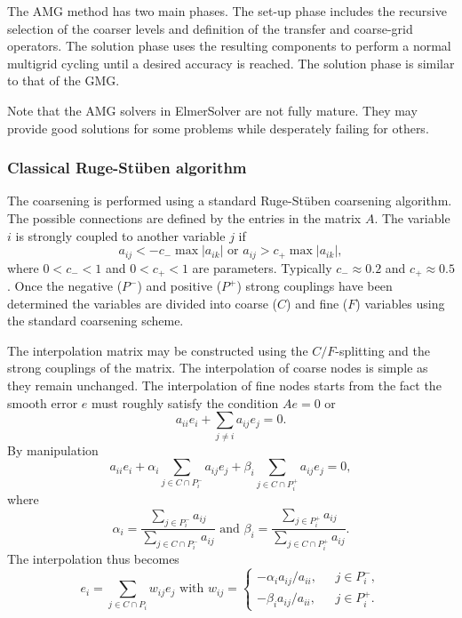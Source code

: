 \begin{versiona}
The AMG method has two main phases. The set-up phase includes the recursive selection of
the coarser levels and definition of the transfer and coarse-grid operators. 
The solution phase uses the resulting components to perform a normal multigrid
cycling until a desired accuracy is reached. The solution phase is similar
to that of the GMG.

Note that the AMG solvers in ElmerSolver are not fully mature. They may provide good solutions for 
some problems while desperately failing for others. 


\subsubsection*{Classical Ruge-St{\"u}ben algorithm}

The coarsening is performed using a standard Ruge-St{\"u}ben coarsening algorithm. 
The possible connections are defined by the 
entries in the matrix $A$. The variable $i$ is strongly coupled
to another variable $j$ if 
\begin{equation}
  a_{ij} < - c_{-} \max | a_{ik} |  \mbox{\ \ \ or \ \ \ }
  a_{ij} > c_{+} \max | a_{ik} | ,
\end{equation}
where $0<c_{-}<1$ and $0<c_{+}<1$ are parameters.
Typically $c_{-} \approx 0.2$ and $c_{+} \approx 0.5$.  
Once the negative ($P^{-}$) and positive ($P^{+}$) 
strong couplings have been determined 
the variables are divided into coarse ($C$) and fine ($F$) 
variables using the standard coarsening scheme.

The interpolation matrix may be constructed 
using the $C/F$-splitting and the strong couplings of the matrix.
The interpolation of coarse nodes is simple as they remain unchanged. 
The interpolation of fine nodes 
starts from the fact the smooth error $e$ 
must roughly satisfy the condition $Ae=0$ or
\begin{equation}
  a_{ii} e_i + \sum_{j \neq i} a_{ij} e_j = 0 .
  \label{eq_interpolate}
\end{equation}
By manipulation 
\begin{equation}
  a_{ii} e_i + \alpha_i \sum_{j \in C \cap P_i^{-}} a_{ij} e_j +
\beta_i \sum_{j \in C \cap P_i^{+}} a_{ij} e_j = 0,
\end{equation}
where
\begin{equation}
  \alpha_i = \frac{ \sum_{j \in P_i^{-}} a_{ij} }{ \sum_{j \in C \cap P_i^{-}} a_{ij}  }
 \mbox{\ \ \ and \ \ \ }
  \beta_i = \frac{ \sum_{j \in P_i^{+}} a_{ij} }{ \sum_{j \in C \cap P_i^{+}} a_{ij}  } .
\end{equation}
The interpolation thus becomes 
\begin{equation}
  e_i = \sum_{j \in C \cap P_i} w_{ij} e_j  \mbox{ \ \ \ with \ \ \ }
w_{ij} = \left \{ 
\begin{array}{ll}
-\alpha_i a_{ij} / a_{ii}, \mbox{ \ } & j \in P_i^{-}, \\
-\beta_i a_{ij} / a_{ii},               & j \in P_i^{+}.
\end{array} 
\right .
\end{equation}


\end{versiona}
